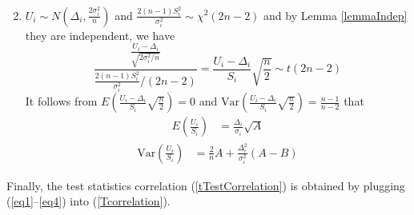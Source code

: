 \documentclass[12pt, a4paper]{article}
\begin{document}
\begin{appendix}
\begin{enumerate}
\begin{align}
				\end{align}
				\item $U_i\sim N(\Delta_i, \frac{2\sigma_i^2}{n})$ and $\frac{2(n-1)S_i^2}{\sigma_i^2} \sim
				\chi^2(2n-2)$ and by Lemma \ref{lemmaIndep} they are independent, we have 
				\[\frac{\frac{U_i-\Delta_i}{\sqrt{2\sigma_i^2/n}}}{\frac{2(n-1)S_i^2}{\sigma_i^2}/(2n-2)}  =
				\frac{U_i-\Delta_i}{S_i}\sqrt{\frac{n}{2}}\sim t(2n-2)\]
				It follows from $E\left(\frac{U_i-\Delta_i}{S_i}\sqrt{\frac{n}{2}}\right)=0 $ and
				$\text{Var}\left(\frac{U_i-\Delta_i}{S_i}\sqrt{\frac{n}{2}}\right) = \frac{n-1}{n-2}$ that
				\begin{align}\label{eqq3}
				E\left(\frac{U_i}{S_i}\right) &= \frac{\Delta_i}{\sigma_i}\sqrt{A}
				\end{align}
				\begin{align}\label{eqq4}
				\text{Var}\left(\frac{U_i}{S_i}\right)&=\frac{2}{n}A + \frac{\Delta_i^2}{\sigma_i^2}(A-B)
				\end{align}
			\end{enumerate}
			Finally,  the test statistics correlation (\ref{tTestCorrelation}) is obtained by plugging
			(\ref{eq1}--\ref{eq4}) into (\ref{Tcorrelation}).
			

\end{appendix}
\end{document}
